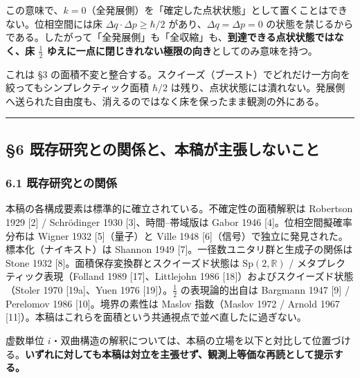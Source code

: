 \documentclass[
]{ltjsarticle}
\begin{document}
この意味で、\(k=0\)（全発展側）を「確定した点状状態」として置くことはできない。位相空間には床
\(\Delta q\cdot\Delta p\ge\hbar/2\) があり、\(\Delta q=\Delta p=0\)
の状態を禁じるからである。したがって「全発展側」も「全収縮」も、\textbf{到達できる点状状態ではなく、床
\(\tfrac12\) ゆえに一点に閉じきれない極限の向き}としてのみ意味を持つ。

これは §3
の面積不変と整合する。スクイーズ（ブースト）でどれだけ一方向を絞ってもシンプレクティック面積
\(\hbar/2\)
は残り、点状状態には潰れない。発展側へ送られた自由度も、消えるのではなく床を保ったまま観測の外にある。

\begin{center}\rule{0.5\linewidth}{0.5pt}\end{center}

\subsection{§6
既存研究との関係と、本稿が主張しないこと}\label{ux65e2ux5b58ux7814ux7a76ux3068ux306eux95a2ux4fc2ux3068ux672cux7a3fux304cux4e3bux5f35ux3057ux306aux3044ux3053ux3068}

\subsubsection{6.1
既存研究との関係}\label{ux65e2ux5b58ux7814ux7a76ux3068ux306eux95a2ux4fc2}

本稿の各構成要素は標準的に確立されている。不確定性の面積解釈は Robertson
1929 {[}2{]} / Schrödinger 1930 {[}3{]}、時間--帯域版は Gabor 1946
{[}4{]}。位相空間擬確率分布は Wigner 1932 {[}5{]}（量子）と Ville 1948
{[}6{]}（信号）で独立に発見された。標本化（ナイキスト）は Shannon 1949
{[}7{]}。一径数ユニタリ群と生成子の関係は Stone 1932
{[}8{]}。面積保存変換群とスクイーズド状態は
\(\mathrm{Sp}(2,\mathbb{R})\) / メタプレクティック表現（Folland 1989
{[}17{]}、Littlejohn 1986 {[}18{]}）およびスクイーズド状態（Stoler 1970
{[}19a{]}、Yuen 1976 {[}19{]}）。\(\tfrac12\) の表現論的出自は Bargmann
1947 {[}9{]} / Perelomov 1986 {[}10{]}。境界の素性は Maslov 指数（Maslov
1972 / Arnold 1967
{[}11{]}）。本稿はこれらを面積という共通視点で並べ直したに過ぎない。

虚数単位
\(i\)・双曲構造の解釈については、本稿の立場を以下と対比して位置づける。\textbf{いずれに対しても本稿は対立を主張せず、観測上等価な再読として提示する。}
\end{document}
